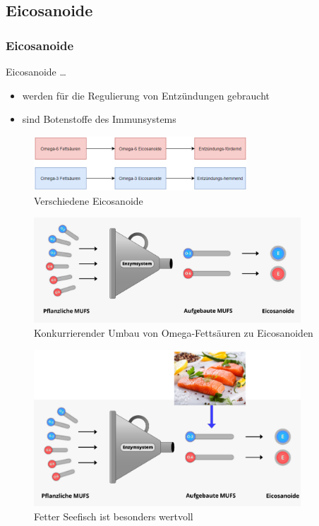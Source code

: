 \documentclass[xcolor=dvipsnames]{beamer}
\begin{document}
    \subsection{Eicosanoide}
    \begin{frame}[allowframebreaks]
        \frametitle{Eicosanoide}

        \begin{block}{Eicosanoide \ldots}
            \begin{itemize}
                \setlength\itemsep{1em}
                \item werden für die Regulierung von Entzündungen gebraucht
                \item sind Botenstoffe des Immunsystems
            \end{itemize}
        \end{block}

        \begin{figure}
            \centering
            \includegraphics[width=8cm]{../images/eico.png}
            \caption{Verschiedene Eicosanoide}
        \end{figure}

        \framebreak

        \begin{figure}
            \centering
            \includegraphics[width=10cm]{../images/eico_1.jpg}
            \caption{Konkurrierender Umbau von Omega-Fettsäuren zu Eicosanoiden}
        \end{figure}

        \framebreak

        \begin{figure}
            \centering
            \includegraphics[width=10cm]{../images/eico_2.png}
            \caption{Fetter Seefisch ist besonders wertvoll}
        \end{figure}

    \end{frame}
\end{document}
